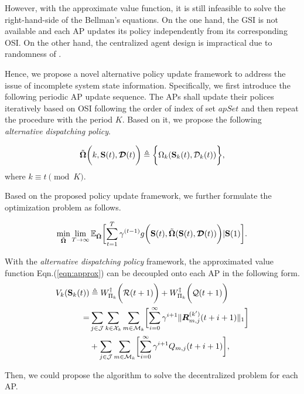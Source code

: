 However, with the approximate value function, it is still infeasible to solve the right-hand-side of the Bellman's equations.
On the one hand, the GSI is not available and each AP updates its policy independently from its corresponding OSI.
On the other hand, the centralized agent design is impractical due to randomness of \brlatency.

Hence, we propose a novel alternative policy update framework to address the issue of incomplete system state information.
Specifically, we first introduce the following periodic AP update sequence.
The APs shall update their polices iteratively based on OSI following the order of index of set $apSet$ and then repeat the procedure with the period $K$.
Based on it, we propose the following \emph{alternative dispatching policy}.
\begin{definition}
    \begin{align}
        \tilde{\boldsymbol{\Omega}}\bigg( k, \mathbf{S}(t), \boldsymbol{\mathcal{D}}(t) \bigg) \triangleq \bigg\{
            \Omega_{k}( \mathbf{S}_{k}(t), \mathcal{D}_{k}(t) )
        \bigg\},
    \end{align}
    where $k \equiv t \pmod{K}$.
\end{definition}

Based on the proposed policy update framework, we further formulate the optimization problem as follows.
\begin{problem}
    \begin{align}
        \min_{\tilde{\Policy}} \lim_{T\to\infty} \mathbb{E}_{\tilde{\Policy}} \Bracket{
            \sum_{t=1}^{T} \gamma^{(t-1)} g\Paren{
                \Stat(t), \tilde{\Policy}(\Stat(t), \Delay(t))
            } | \Stat(1)
        }.
    \end{align}
    \label{problem_2}
\end{problem}

\begin{lemma}
    With the \emph{alternative dispatching policy} framework, the approximated value function Eqn.(\ref{eqn:approx}) can be decoupled onto each AP in the following form.
    \begin{align}
        V_{k}(\Stat_{k}(t)) &\define W^{\AP}_{\Pi_{k}}\Paren{\mathcal{R}(t+1)} + W^{\ES}_{\Pi_{k}}\Paren{\mathcal{Q}(t+1)}
        \nonumber\\
        =& \sum_{j\in\jSpace}\sum_{k\in\ccSet_{k}}\sum_{m\in\esSet_{k}} \Bracket{
            \sum_{i=0}^{\infty} \gamma^{i+1} \Inorm{ \vecG{R}^{(k')}_{m,j}(t+i+1) }
        }
        \nonumber\\
        & + \sum_{j\in\jSpace}\sum_{m\in\esSet_{k}} \Bracket{
            \sum_{i=0}^{\infty} \gamma^{i+1} Q_{m,j}(t+i+1)
        },
    \end{align}
\end{lemma}
Then, we could propose the algorithm to solve the decentralized problem for each AP.

